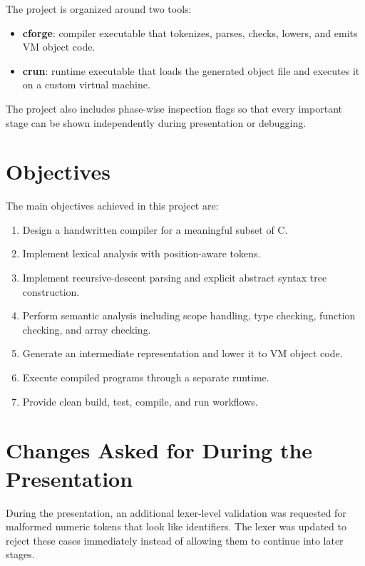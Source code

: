 \documentclass[11pt,a4paper]{article}
\begin{document}
The project is organized around two tools:

\begin{itemize}[leftmargin=2em]
    \item \textbf{cforge}: compiler executable that tokenizes, parses, checks,
    lowers, and emits VM object code.
    \item \textbf{crun}: runtime executable that loads the generated object file
    and executes it on a custom virtual machine.
\end{itemize}

The project also includes phase-wise inspection flags so that every important
stage can be shown independently during presentation or debugging.

\section{Objectives}

The main objectives achieved in this project are:

\begin{enumerate}[leftmargin=2em]
    \item Design a handwritten compiler for a meaningful subset of C.
    \item Implement lexical analysis with position-aware tokens.
    \item Implement recursive-descent parsing and explicit abstract syntax tree
    construction.
    \item Perform semantic analysis including scope handling, type checking,
    function checking, and array checking.
    \item Generate an intermediate representation and lower it to VM object
    code.
    \item Execute compiled programs through a separate runtime.
    \item Provide clean build, test, compile, and run workflows.
\end{enumerate}

\section{Changes Asked for During the Presentation}

During the presentation, an additional lexer-level validation was requested for
malformed numeric tokens that look like identifiers. The lexer was updated to
reject these cases immediately instead of allowing them to continue into later
stages.
\end{document}
